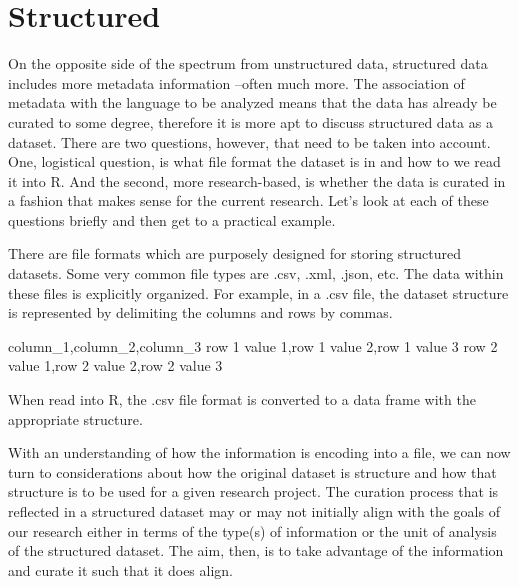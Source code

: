 \documentclass[
  letterpaper,
  DIV=11,
  numbers=noendperiod]{scrreport}
\newenvironment{Shaded}{\begin{snugshade}}{\end{snugshade}}
\newcommand{\NormalTok}[1]{\textcolor[rgb]{0.00,0.00,0.00}{#1}}
\theoremstyle{definition}
\theoremstyle{remark}
\begin{document}
\hypertarget{structured}{%
\section{Structured}\label{structured}}

On the opposite side of the spectrum from unstructured data, structured
data includes more metadata information --often much more. The
association of metadata with the language to be analyzed means that the
data has already be curated to some degree, therefore it is more apt to
discuss structured data as a dataset. There are two questions, however,
that need to be taken into account. One, logistical question, is what
file format the dataset is in and how to we read it into R. And the
second, more research-based, is whether the data is curated in a fashion
that makes sense for the current research. Let's look at each of these
questions briefly and then get to a practical example.

There are file formats which are purposely designed for storing
structured datasets. Some very common file types are .csv, .xml, .json,
etc. The data within these files is explicitly organized. For example,
in a .csv file, the dataset structure is represented by delimiting the
columns and rows by commas.

\begin{Shaded}
\begin{Highlighting}[]
\NormalTok{column\_1,column\_2,column\_3}
\NormalTok{row 1 value 1,row 1 value 2,row 1 value 3}
\NormalTok{row 2 value 1,row 2 value 2,row 2 value 3}
\end{Highlighting}
\end{Shaded}

When read into R, the .csv file format is converted to a data frame with
the appropriate structure.

\begin{table}

\end{table}

With an understanding of how the information is encoding into a file, we
can now turn to considerations about how the original dataset is
structure and how that structure is to be used for a given research
project. The curation process that is reflected in a structured dataset
may or may not initially align with the goals of our research either in
terms of the type(s) of information or the unit of analysis of the
structured dataset. The aim, then, is to take advantage of the
information and curate it such that it does align.
\end{document}
